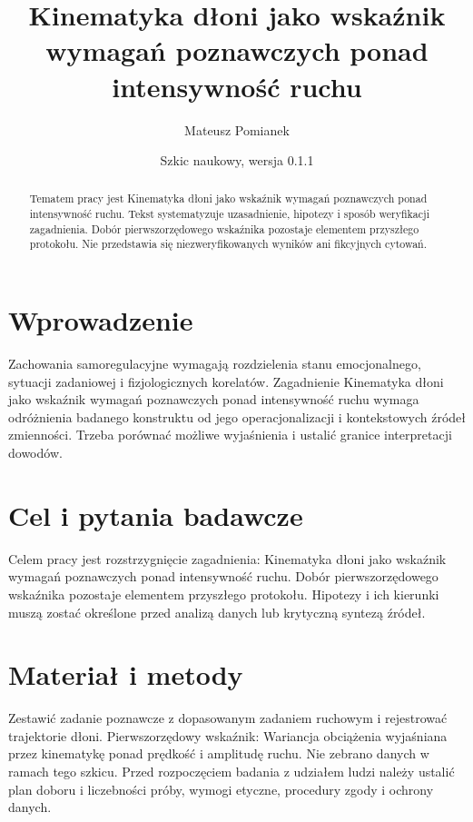\documentclass[11pt,a4paper]{article}
\title{Kinematyka dłoni jako wskaźnik wymagań poznawczych ponad intensywność ruchu}
\author{Mateusz Pomianek}
\date{Szkic naukowy, wersja 0.1.1}
\begin{document}
\maketitle

\begin{abstract}

Tematem pracy jest Kinematyka dłoni jako wskaźnik wymagań poznawczych ponad intensywność ruchu. Tekst systematyzuje uzasadnienie, hipotezy i sposób weryfikacji zagadnienia. Dobór pierwszorzędowego wskaźnika pozostaje elementem przyszłego protokołu. Nie przedstawia się niezweryfikowanych wyników ani fikcyjnych cytowań.

\end{abstract}

\section{Wprowadzenie}

Zachowania samoregulacyjne wymagają rozdzielenia stanu emocjonalnego, sytuacji zadaniowej i fizjologicznych korelatów. Zagadnienie Kinematyka dłoni jako wskaźnik wymagań poznawczych ponad intensywność ruchu wymaga odróżnienia badanego konstruktu od jego operacjonalizacji i kontekstowych źródeł zmienności. Trzeba porównać możliwe wyjaśnienia i ustalić granice interpretacji dowodów.

\section{Cel i pytania badawcze}

Celem pracy jest rozstrzygnięcie zagadnienia: Kinematyka dłoni jako wskaźnik wymagań poznawczych ponad intensywność ruchu. Dobór pierwszorzędowego wskaźnika pozostaje elementem przyszłego protokołu. Hipotezy i ich kierunki muszą zostać określone przed analizą danych lub krytyczną syntezą źródeł.

\section{Materiał i metody}

Zestawić zadanie poznawcze z dopasowanym zadaniem ruchowym i rejestrować trajektorie dłoni. Pierwszorzędowy wskaźnik: Wariancja obciążenia wyjaśniana przez kinematykę ponad prędkość i amplitudę ruchu. Nie zebrano danych w ramach tego szkicu. Przed rozpoczęciem badania z udziałem ludzi należy ustalić plan doboru i liczebności próby, wymogi etyczne, procedury zgody i ochrony danych.
\end{document}
